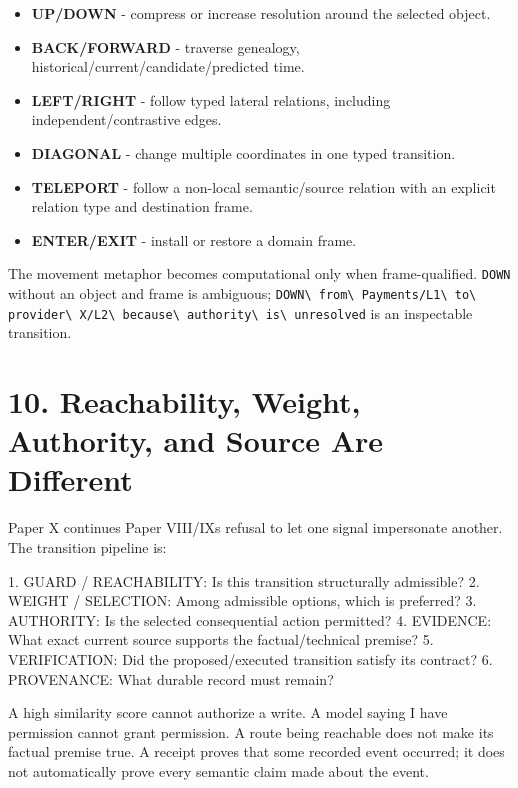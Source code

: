 \documentclass[
  10pt,
  letterpaper,
]{article}
\newenvironment{Shaded}{}{}
\newcommand{\NormalTok}[1]{#1}
\providecommand{\tightlist}{%
  \setlength{\itemsep}{0pt}\setlength{\parskip}{0pt}}
\begin{document}
\begin{itemize}
\tightlist
\item
  \textbf{UP/DOWN} - compress or increase resolution around the selected
  object.
\item
  \textbf{BACK/FORWARD} - traverse genealogy,
  historical/current/candidate/predicted time.
\item
  \textbf{LEFT/RIGHT} - follow typed lateral relations, including
  independent/contrastive edges.
\item
  \textbf{DIAGONAL} - change multiple coordinates in one typed
  transition.
\item
  \textbf{TELEPORT} - follow a non-local semantic/source relation with
  an explicit relation type and destination frame.
\item
  \textbf{ENTER/EXIT} - install or restore a domain frame.
\end{itemize}

The movement metaphor becomes computational only when frame-qualified.
\nolinkurl{DOWN} without an object and frame is ambiguous;
\nolinkurl{DOWN\ from\ Payments/L1\ to\ provider\ X/L2\ because\ authority\ is\ unresolved}
is an inspectable transition.

\section{10. Reachability, Weight, Authority, and Source Are
Different}\label{10-reachability-weight-authority-and-source-are-different}

Paper X continues Paper VIII/IX\textquotesingle s refusal to let one
signal impersonate another. The transition pipeline is:

\begin{Shaded}
\begin{Highlighting}[]
\NormalTok{1. GUARD / REACHABILITY: Is this transition structurally admissible?}
\NormalTok{2. WEIGHT / SELECTION: Among admissible options, which is preferred?}
\NormalTok{3. AUTHORITY: Is the selected consequential action permitted?}
\NormalTok{4. EVIDENCE: What exact current source supports the factual/technical premise?}
\NormalTok{5. VERIFICATION: Did the proposed/executed transition satisfy its contract?}
\NormalTok{6. PROVENANCE: What durable record must remain?}
\end{Highlighting}
\end{Shaded}

A high similarity score cannot authorize a write. A model saying
\textquotesingle I have permission\textquotesingle{} cannot grant
permission. A route being reachable does not make its factual premise
true. A receipt proves that some recorded event occurred; it does not
automatically prove every semantic claim made about the event.
\end{document}
